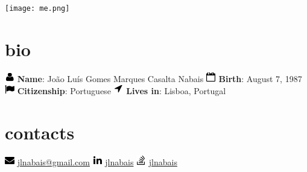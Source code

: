 \documentclass[]{friggeri-cv} %
\begin{document}


\begin{aside} %
\texttt{[image: me.png]} 
\section{bio}
\includegraphics[scale=0.5, left]{USER.png}
\vspace{-5mm} \textbf{Name}: João Luís Gomes Marques Casalta Nabais
\includegraphics[scale=0.5, left]{calendar.png}
\vspace{-5mm} \textbf{Birth}: August 7, 1987
\includegraphics[scale=0.5, left]{flag.png}
\vspace{-5mm} \textbf{Citizenship}: Portuguese
\includegraphics[scale=0.5, left]{location.png} 
\vspace{-5mm} \textbf{Lives in}: Lisboa, Portugal
\section{contacts}
\includegraphics[scale=0.5, left]{envelope.png}
\vspace{-5mm} \href{mailto:jlnabais@gmail.com}{jlnabais@gmail.com}
\includegraphics[scale=0.5, left]{linkedin.png} 
\vspace{-5mm} \href{http://www.linkedin.com/in/jlnabais}{jlnabais}
\includegraphics[scale=0.5, left]{stack-overflow.png} 
\vspace{-5mm} \href{http://stackoverflow.com/users/5145800/jlnabais}{jlnabais}

\end{aside}
\end{document}

